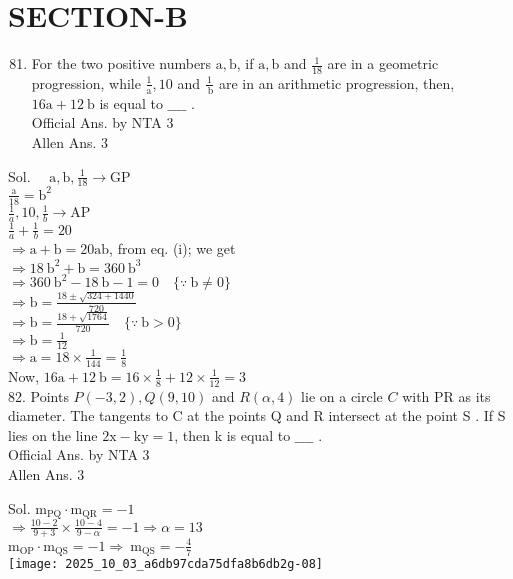\documentclass[10pt]{article}
\begin{document}
\section*{SECTION-B}
\begin{enumerate}
  \setcounter{enumi}{80}
  \item For the two positive numbers \(\mathrm{a}, \mathrm{b}\), if \(\mathrm{a}, \mathrm{b}\) and \(\frac{1}{18}\) are in a geometric progression, while \(\frac{1}{\mathrm{a}}, 10\) and \(\frac{1}{\mathrm{~b}}\) are in an arithmetic progression, then, \(16 \mathrm{a}+12 \mathrm{~b}\) is equal to \(\_\_\_\_\) .\\
Official Ans. by NTA 3\\
Allen Ans. 3
\end{enumerate}

Sol. \(\quad \mathrm{a}, \mathrm{b}, \frac{1}{18} \rightarrow \mathrm{GP}\)\\
\(\frac{\mathrm{a}}{18}=\mathrm{b}^{2}\)\\
\(\frac{1}{a}, 10, \frac{1}{b} \rightarrow \mathrm{AP}\)\\
\(\frac{1}{a}+\frac{1}{b}=20\)\\
\(\Rightarrow \mathrm{a}+\mathrm{b}=20 \mathrm{ab}\), from eq. (i); we get\\
\(\Rightarrow 18 \mathrm{~b}^{2}+\mathrm{b}=360 \mathrm{~b}^{3}\)\\
\(\Rightarrow 360 \mathrm{~b}^{2}-18 \mathrm{~b}-1=0 \quad\{\because \mathrm{~b} \neq 0\}\)\\
\(\Rightarrow \mathrm{b}=\frac{18 \pm \sqrt{324+1440}}{720}\)\\
\(\Rightarrow \mathrm{b}=\frac{18+\sqrt{1764}}{720} \quad\{\because \mathrm{~b}>0\}\)\\
\(\Rightarrow \mathrm{b}=\frac{1}{12}\)\\
\(\Rightarrow \mathrm{a}=18 \times \frac{1}{144}=\frac{1}{8}\)\\
Now, \(16 \mathrm{a}+12 \mathrm{~b}=16 \times \frac{1}{8}+12 \times \frac{1}{12}=3\)\\
82. Points \(P(-3,2), Q(9,10)\) and \(R(\alpha, 4)\) lie on a circle \(C\) with PR as its diameter. The tangents to C at the points Q and R intersect at the point S . If S lies on the line \(2 \mathrm{x}-\mathrm{ky}=1\), then k is equal to \(\_\_\_\_\) .\\
Official Ans. by NTA 3\\
Allen Ans. 3

Sol. \(\mathrm{m}_{\mathrm{PQ}} \cdot \mathrm{m}_{\mathrm{QR}}=-1\)\\
\(\Rightarrow \frac{10-2}{9+3} \times \frac{10-4}{9-\alpha}=-1 \Rightarrow \alpha=13\)\\
\(\mathrm{m}_{\mathrm{OP}} \cdot \mathrm{m}_{\mathrm{QS}}=-1 \Rightarrow \mathrm{~m}_{\mathrm{QS}}=-\frac{4}{7}\)\\
\texttt{[image: 2025\_10\_03\_a6db97cda75dfa8b6db2g-08]}
\end{document}
